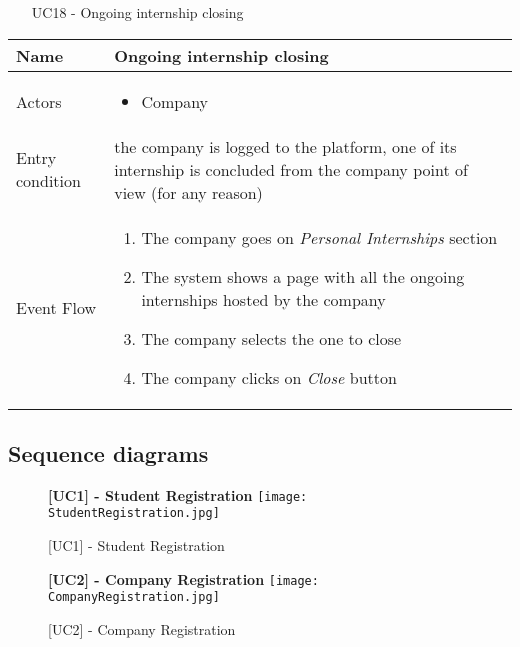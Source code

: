 				
				\begin{table} [H]
					\centering
					\begin{itemize}
						\item [UC18] - Ongoing internship closing
					\end{itemize}
					
					\begin{tabular}{|| P{7.5cm} | P{7.5cm} ||}
						\hline
						Name & Ongoing internship closing \\
						\hline
						Actors & \parbox{5cm}{\begin{itemize}
								\item Company
							\end{itemize}
						} \\
						\hline
						Entry condition & the company is logged to the platform, one of its internship is concluded from the company point of view (for any reason)  \\
						\hline
						Event Flow & \parbox{5cm}{\begin{enumerate}
								\item The company goes on \textit{Personal Internships} section 
								\item The system shows a page with 
								all the ongoing internships hosted by the company  
								\item The company selects the one to close
								\item The company clicks on \textit{Close} button
						\end{enumerate}} \\
						\hline 
					\end{tabular}
				\end{table}
				
		\subsection{Sequence diagrams}
		
			\begin{figure}[H]
				\centering
				{\bfseries [UC1] - Student Registration}
				\texttt{[image: StudentRegistration.jpg]}
				\caption{[UC1] - Student Registration}
			\end{figure}
			
			\begin{figure}[H]
				\centering
				{\bfseries [UC2] - Company Registration}
				\texttt{[image: CompanyRegistration.jpg]}
				\caption{[UC2] - Company Registration}
				
			\end{figure}
			
